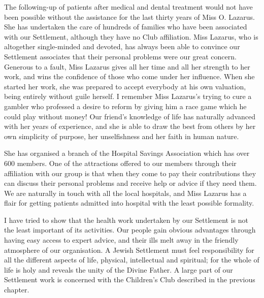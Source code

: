 The following-up of patients after medical and dental
treatment would not have been possible without the assistance
for the last thirty years of Miss O. Lazarus. She
has undertaken the care of hundreds of families who have
been associated with our Settlement, although they have
no Club affiliation. Miss Lazarus, who is altogether single-minded
and devoted, has always been able to convince
our Settlement associates that their personal problems
were our great concern. Generous to a fault, Miss Lazarus
gives all her time and all her strength to her work, and
wins the confidence of those who come under her influence.
When she started her work, she was prepared to
accept everybody at his own valuation, being entirely
without guile herself. I remember Miss Lazarus’s trying
to cure a gambler who professed a desire to reform by
giving him a race game which he could play without
money! Our friend’s knowledge of life has naturally
advanced with her years of experience, and she is able to
draw the best from others by her own simplicity of purpose,
her unselfishness and her faith in human nature.

She has organised a branch of the Hospital Savings
Association which has over 600 members. One of the
attractions offered to our members through their affiliation
with our group is that when they come to pay their
contributions they can discuss their personal problems and
receive help or advice if they need them. We are naturally
in touch with all the local hospitals, and Miss
Lazarus has a flair for getting patients admitted into
hospital with the least possible formality.

I have tried to show that the health work undertaken
by our Settlement is not the least important of its activities.
Our people gain obvious advantages through having
easy access to expert advice, and their ills melt away in
the friendly atmosphere of our organisation. A Jewish
Settlement must feel responsibility for all the different
aspects of life, physical, intellectual and spiritual; for
the whole of life is holy and reveals the unity of the
Divine Father. A large part of our Settlement work is
concerned with the Children’s Club described in the
previous chapter.

